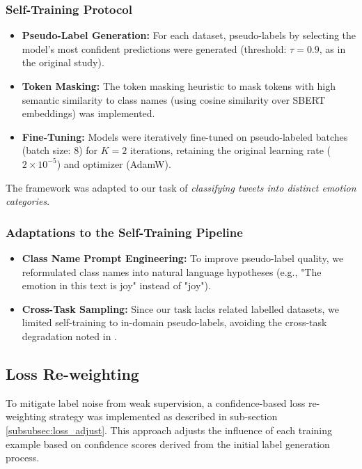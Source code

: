 \subsubsection*{Self-Training Protocol}
\begin{itemize}
    \item \textbf{Pseudo-Label Generation:} For each dataset, pseudo-labels by selecting the model’s most confident predictions were generated (threshold: $\tau = 0.9$, as in the original study).
    \item \textbf{Token Masking:} The token masking heuristic to mask tokens with high semantic similarity to class names (using cosine similarity over SBERT embeddings) was implemented.
    \item \textbf{Fine-Tuning:} Models were iteratively fine-tuned on pseudo-labeled batches (batch size: 8) for $K = 2$ iterations, retaining the original learning rate ($2 \times 10^{-5}$) and optimizer (AdamW).
\end{itemize}

\noindent
The framework was adapted to our task of \textit{classifying tweets into distinct emotion categories}.

\subsubsection*{Adaptations to the Self-Training Pipeline}
\begin{itemize}
    \item \textbf{Class Name Prompt Engineering:} To improve pseudo-label quality, we reformulated class names into natural language hypotheses (e.g., "The emotion in this text is joy" instead of "joy").
    \item \textbf{Cross-Task Sampling:} Since our task lacks related labelled datasets, we limited self-training to in-domain pseudo-labels, avoiding the cross-task degradation noted in \cite{gera_zero-shot_2022}.
\end{itemize}


\subsection{Loss Re-weighting}  
\label{sec:loss_reweighting}  

To mitigate label noise from weak supervision, a confidence-based loss re-weighting strategy was implemented as described in sub-section \ref{subsubsec:loss_adjust}. This approach adjusts the influence of each training example based on confidence scores derived from the initial label generation process.  

